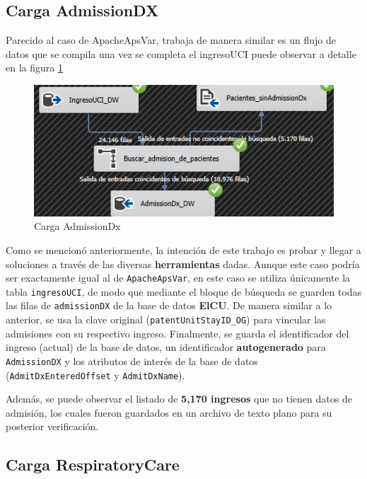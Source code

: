 \documentclass[12pt, a4paper, twoside]{article}
\begin{document}
	
	
	\subsection{Carga AdmissionDX}
	
	Parecido al caso de ApacheApsVar, trabaja de manera similar es un flujo de datos que se compila una vez se completa el ingresoUCI puede observar a detalle en la figura \ref{fig:34}
	
	\begin{figure}[H]
		\centering
		\includegraphics[width=1\textwidth]{image/121_AdmissionDx.png}
		\caption{Carga AdmissionDx}
		\label{fig:34}
	\end{figure}
	
	Como se mencionó anteriormente, la intención de este trabajo es probar y llegar a soluciones a través de las diversas \textbf{herramientas} dadas. Aunque este caso podría ser exactamente igual al de \texttt{ApacheApsVar}, en este caso se utiliza únicamente la tabla \texttt{ingresoUCI}, de modo que mediante el bloque de búsqueda se guarden todas las filas de \texttt{admissionDX} de la base de datos \textbf{ElCU}. De manera similar a lo anterior, se usa la clave original (\texttt{patentUnitStayID\_OG}) para vincular las admisiones con su respectivo ingreso. Finalmente, se guarda el identificador del ingreso (actual) de la base de datos, un identificador \textbf{autogenerado} para \texttt{AdmissionDX} y los atributos de interés de la base de datos (\texttt{AdmitDxEnteredOffset} y \texttt{AdmitDxName}). 
	
	Además, se puede observar el listado de \textbf{5,170 ingresos} que no tienen datos de admisión, los cuales fueron guardados en un archivo de texto plano para su posterior verificación.
	
	
	\subsection{Carga RespiratoryCare}
	
\end{document}
